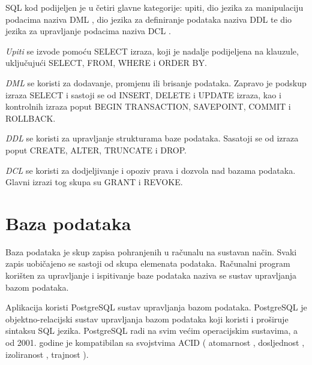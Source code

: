 \documentclass[times, utf8, zavrsni, numeric]{fer}
\begin{document}
SQL kod podijeljen je u četiri glavne kategorije: upiti, dio jezika za manipulaciju podacima naziva DML , dio jezika za definiranje podataka naziva DDL  te dio jezika za upravljanje podacima naziva DCL .

\emph{Upiti} se izvode pomoću SELECT izraza, koji je nadalje podijeljena na klauzule, uključujući SELECT, FROM, WHERE i ORDER BY.

\emph{DML} se koristi za dodavanje, promjenu ili brisanje podataka. Zapravo je podskup izraza SELECT i sastoji se od INSERT, DELETE i UPDATE izraza, kao i kontrolnih izraza poput BEGIN TRANSACTION, SAVEPOINT, COMMIT i ROLLBACK.

\emph{DDL} se koristi za upravljanje strukturama baze podataka. Sasatoji se od izraza poput CREATE, ALTER, TRUNCATE i DROP.

\emph{DCL} se koristi za dodjeljivanje i opoziv prava i dozvola nad bazama podataka. Glavni izrazi tog skupa su GRANT i REVOKE.
\section{Baza podataka}
Baza podataka je skup zapisa pohranjenih u računalu na sustavan način. Svaki zapis uobičajeno se sastoji od skupa elemenata podataka. Računalni program korišten za upravljanje i ispitivanje baze podataka naziva se sustav upravljanja bazom podataka.

Aplikacija koristi PostgreSQL sustav upravljanja bazom podataka. PostgreSQL je objektno-relacijski sustav upravljanja bazom podataka koji koristi i proširuje sintaksu SQL jezika. PostgreSQL radi na svim većim operacijskim sustavima, a od 2001. godine je kompatibilan sa svojstvima ACID ( atomarnost , dosljednost , izoliranost , trajnost )\cite{PostgreS70:online}.
\end{document}
